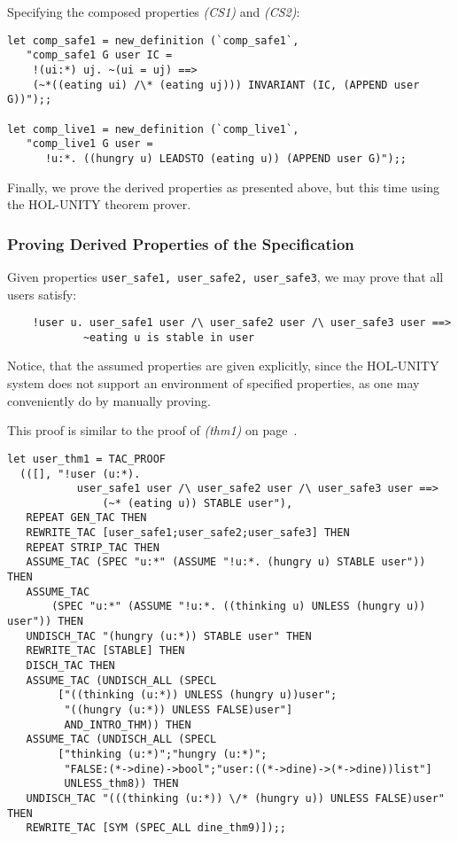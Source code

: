 Specifying the composed properties {\it (CS1)} and {\it (CS2)}:
{\footnotesize 
\begin{verbatim}
let comp_safe1 = new_definition (`comp_safe1`,
   "comp_safe1 G user IC =
    !(ui:*) uj. ~(ui = uj) ==>
    (~*((eating ui) /\* (eating uj))) INVARIANT (IC, (APPEND user G))");;

let comp_live1 = new_definition (`comp_live1`,
   "comp_live1 G user =
      !u:*. ((hungry u) LEADSTO (eating u)) (APPEND user G)");;
\end{verbatim}
}

Finally, we prove the derived properties as presented above, but this time
using the HOL-UNITY theorem prover.

\subsubsection{Proving Derived Properties of the Specification}

Given properties {\tt user\_safe1, user\_safe2, user\_safe3}, we may prove that
all users satisfy:

{\footnotesize 
\begin{verbatim}
	!user u. user_safe1 user /\ user_safe2 user /\ user_safe3 user ==>
            ~eating u is stable in user
\end{verbatim}
}
Notice, that the assumed properties are given explicitly, since the HOL-UNITY
system does not support an environment of specified properties, as one
may conveniently do by manually proving.

\smallskip
This proof is similar to the proof of {\it (thm1)} on page~\pageref{thm1page}.

{\footnotesize 
\begin{verbatim}
let user_thm1 = TAC_PROOF
  (([], "!user (u:*).
           user_safe1 user /\ user_safe2 user /\ user_safe3 user ==>
               (~* (eating u)) STABLE user"),
   REPEAT GEN_TAC THEN
   REWRITE_TAC [user_safe1;user_safe2;user_safe3] THEN
   REPEAT STRIP_TAC THEN
   ASSUME_TAC (SPEC "u:*" (ASSUME "!u:*. (hungry u) STABLE user")) THEN
   ASSUME_TAC
       (SPEC "u:*" (ASSUME "!u:*. ((thinking u) UNLESS (hungry u)) user")) THEN
   UNDISCH_TAC "(hungry (u:*)) STABLE user" THEN
   REWRITE_TAC [STABLE] THEN
   DISCH_TAC THEN
   ASSUME_TAC (UNDISCH_ALL (SPECL
        ["((thinking (u:*)) UNLESS (hungry u))user";
         "((hungry (u:*)) UNLESS FALSE)user"]
         AND_INTRO_THM)) THEN
   ASSUME_TAC (UNDISCH_ALL (SPECL
        ["thinking (u:*)";"hungry (u:*)";
         "FALSE:(*->dine)->bool";"user:((*->dine)->(*->dine))list"]
         UNLESS_thm8)) THEN
   UNDISCH_TAC "(((thinking (u:*)) \/* (hungry u)) UNLESS FALSE)user" THEN
   REWRITE_TAC [SYM (SPEC_ALL dine_thm9)]);;
\end{verbatim}
}


